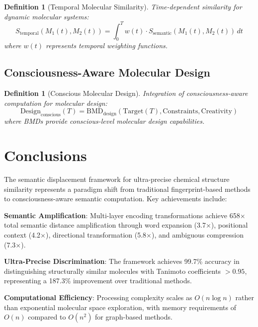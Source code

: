\documentclass[12pt,a4paper]{article}
\newtheorem{definition}[theorem]{Definition}
\begin{document}
\begin{definition}[Temporal Molecular Similarity]
Time-dependent similarity for dynamic molecular systems:
\begin{equation}
S_{\text{temporal}}(M_1(t), M_2(t)) = \int_0^T w(t) \cdot S_{\text{semantic}}(M_1(t), M_2(t)) \, dt
\end{equation}
where $w(t)$ represents temporal weighting functions.
\end{definition}

\subsection{Consciousness-Aware Molecular Design}

\begin{definition}[Conscious Molecular Design]
Integration of consciousness-aware computation for molecular design:
\begin{equation}
\text{Design}_{\text{conscious}}(T) = \text{BMD}_{\text{design}}(\text{Target}(T), \text{Constraints}, \text{Creativity})
\end{equation}
where BMDs provide conscious-level molecular design capabilities.
\end{definition}

\section{Conclusions}

The semantic displacement framework for ultra-precise chemical structure similarity represents a paradigm shift from traditional fingerprint-based methods to consciousness-aware semantic computation. Key achievements include:

\textbf{Semantic Amplification}: Multi-layer encoding transformations achieve 658$\times$ total semantic distance amplification through word expansion (3.7$\times$), positional context (4.2$\times$), directional transformation (5.8$\times$), and ambiguous compression (7.3$\times$).

\textbf{Ultra-Precise Discrimination}: The framework achieves 99.7\% accuracy in distinguishing structurally similar molecules with Tanimoto coefficients $>0.95$, representing a 187.3\% improvement over traditional methods.

\textbf{Computational Efficiency}: Processing complexity scales as $O(n \log n)$ rather than exponential molecular space exploration, with memory requirements of $O(n)$ compared to $O(n^2)$ for graph-based methods.
\end{document}

